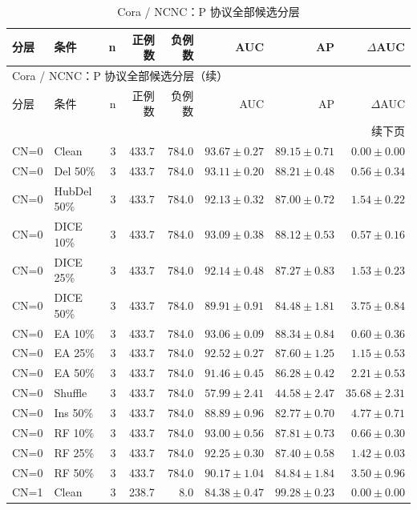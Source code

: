 {\footnotesize
\setlength{\tabcolsep}{3.2pt}
\renewcommand{\arraystretch}{1.10}
\begin{longtable}{llrrrrrr}
\caption{Cora / NCNC：P 协议全部候选分层}\\
\toprule
分层 & 条件 & n & 正例数 & 负例数 & AUC & AP & $\Delta$AUC \\
\midrule
\endfirsthead
\multicolumn{8}{l}{Cora / NCNC：P 协议全部候选分层（续）}\\
\toprule
分层 & 条件 & n & 正例数 & 负例数 & AUC & AP & $\Delta$AUC \\
\midrule
\endhead
\midrule\multicolumn{8}{r}{续下页}\\
\endfoot
\bottomrule
\endlastfoot
CN=0 & Clean & 3 & 433.7 & 784.0 & $93.67\pm0.27$ & $89.15\pm0.71$ & $0.00\pm0.00$ \\
CN=0 & Del 50\% & 3 & 433.7 & 784.0 & $93.11\pm0.20$ & $88.21\pm0.48$ & $0.56\pm0.34$ \\
CN=0 & HubDel 50\% & 3 & 433.7 & 784.0 & $92.13\pm0.32$ & $87.00\pm0.72$ & $1.54\pm0.22$ \\
CN=0 & DICE 10\% & 3 & 433.7 & 784.0 & $93.09\pm0.38$ & $88.12\pm0.53$ & $0.57\pm0.16$ \\
CN=0 & DICE 25\% & 3 & 433.7 & 784.0 & $92.14\pm0.48$ & $87.27\pm0.83$ & $1.53\pm0.23$ \\
CN=0 & DICE 50\% & 3 & 433.7 & 784.0 & $89.91\pm0.91$ & $84.48\pm1.81$ & $3.75\pm0.84$ \\
CN=0 & EA 10\% & 3 & 433.7 & 784.0 & $93.06\pm0.09$ & $88.34\pm0.84$ & $0.60\pm0.36$ \\
CN=0 & EA 25\% & 3 & 433.7 & 784.0 & $92.52\pm0.27$ & $87.60\pm1.25$ & $1.15\pm0.53$ \\
CN=0 & EA 50\% & 3 & 433.7 & 784.0 & $91.46\pm0.45$ & $86.28\pm0.42$ & $2.21\pm0.53$ \\
CN=0 & Shuffle & 3 & 433.7 & 784.0 & $57.99\pm2.41$ & $44.58\pm2.47$ & $35.68\pm2.31$ \\
CN=0 & Ins 50\% & 3 & 433.7 & 784.0 & $88.89\pm0.96$ & $82.77\pm0.70$ & $4.77\pm0.71$ \\
CN=0 & RF 10\% & 3 & 433.7 & 784.0 & $93.00\pm0.56$ & $87.81\pm0.73$ & $0.66\pm0.30$ \\
CN=0 & RF 25\% & 3 & 433.7 & 784.0 & $92.25\pm0.30$ & $87.40\pm0.58$ & $1.42\pm0.03$ \\
CN=0 & RF 50\% & 3 & 433.7 & 784.0 & $90.17\pm1.04$ & $84.84\pm1.84$ & $3.50\pm0.96$ \\
CN=1 & Clean & 3 & 238.7 & 8.0 & $84.38\pm0.47$ & $99.28\pm0.23$ & $0.00\pm0.00$ \\

\end{longtable}}
